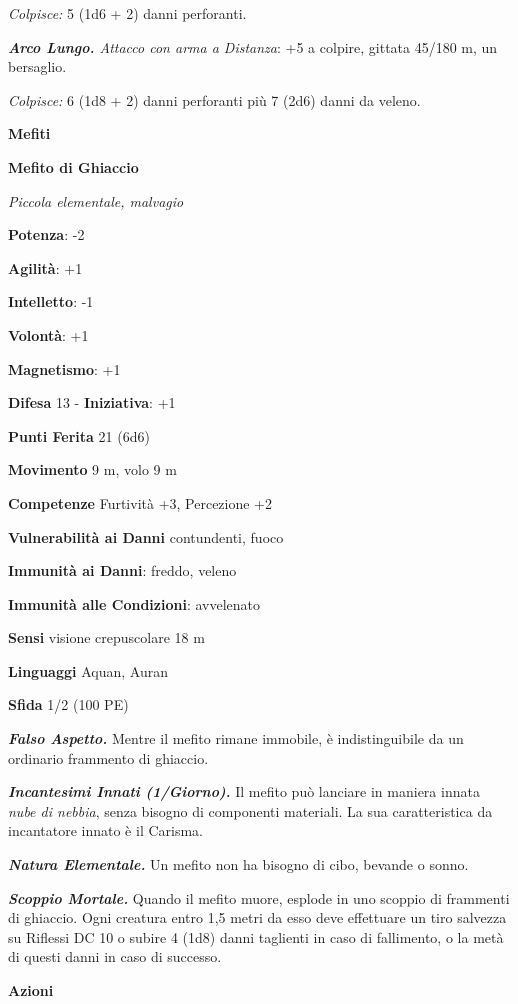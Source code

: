 \begin{multicols}{2}
\emph{Colpisce:} 5 (1d6 + 2) danni perforanti.

\emph{\textbf{Arco Lungo.} Attacco con arma a Distanza}: +5 a colpire,
gittata 45/180 m, un bersaglio.

\emph{Colpisce:} 6 (1d8 + 2) danni perforanti più 7 (2d6) danni da
veleno.

\textbf{Mefiti}

\textbf{Mefito di Ghiaccio}

\emph{Piccola elementale, malvagio}

\textbf{Potenza}: -2

\textbf{Agilità}: +1

\textbf{Intelletto}: -1

\textbf{Volontà}: +1

\textbf{Magnetismo}: +1

\textbf{Difesa} 13 - \textbf{Iniziativa}: +1

\textbf{Punti Ferita} 21 (6d6)

\textbf{Movimento} 9 m, volo 9 m

\textbf{Competenze} Furtività +3, Percezione +2

\textbf{Vulnerabilità ai Danni} contundenti, fuoco

\textbf{Immunità ai Danni}: freddo, veleno

\textbf{Immunità alle Condizioni}: avvelenato

\textbf{Sensi} visione crepuscolare 18 m

\textbf{Linguaggi} Aquan, Auran

\textbf{Sfida} 1/2 (100 PE)\smallskip

\emph{\textbf{Falso Aspetto.}} Mentre il mefito rimane immobile, è
indistinguibile da un ordinario frammento di ghiaccio.

\emph{\textbf{Incantesimi Innati (1/Giorno).}} Il mefito può lanciare in
maniera innata \emph{nube di nebbia}, senza bisogno di componenti
materiali. La sua caratteristica da incantatore innato è il Carisma.

\emph{\textbf{Natura Elementale.}} Un mefito non ha bisogno di cibo,
bevande o sonno.

\emph{\textbf{Scoppio Mortale.}} Quando il mefito muore, esplode in uno
scoppio di frammenti di ghiaccio. Ogni creatura entro 1,5 metri da esso
deve effettuare un tiro salvezza su Riflessi DC 10 o subire 4 (1d8)
danni taglienti in caso di fallimento, o la metà di questi danni in caso
di successo.

\smallskip\textbf{Azioni}


\end{multicols}

